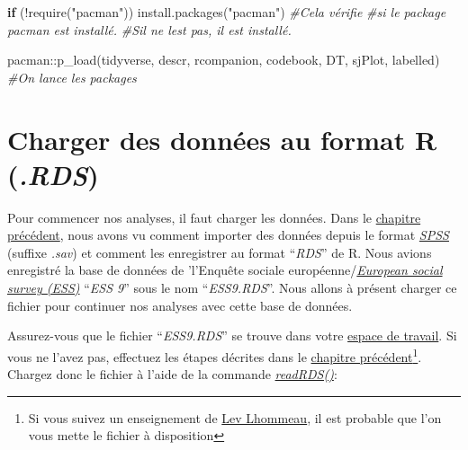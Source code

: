 \documentclass[
]{book}
\newenvironment{Shaded}{\begin{snugshade}}{\end{snugshade}}
\newcommand{\CommentTok}[1]{\textcolor[rgb]{0.56,0.35,0.01}{\textit{#1}}}
\newcommand{\ControlFlowTok}[1]{\textcolor[rgb]{0.13,0.29,0.53}{\textbf{#1}}}
\newcommand{\FunctionTok}[1]{\textcolor[rgb]{0.00,0.00,0.00}{#1}}
\newcommand{\NormalTok}[1]{#1}
\newcommand{\SpecialCharTok}[1]{\textcolor[rgb]{0.00,0.00,0.00}{#1}}
\newcommand{\StringTok}[1]{\textcolor[rgb]{0.31,0.60,0.02}{#1}}
\begin{document}
\begin{Shaded}
\begin{Highlighting}[]
\ControlFlowTok{if}\NormalTok{ (}\SpecialCharTok{!}\FunctionTok{require}\NormalTok{(}\StringTok{"pacman"}\NormalTok{)) }\FunctionTok{install.packages}\NormalTok{(}\StringTok{"pacman"}\NormalTok{) }\CommentTok{\#Cela vérifie}
                             \CommentTok{\#si le package pacman est installé.}
                             \CommentTok{\#S\textquotesingle{}il ne l\textquotesingle{}est pas, il est installé.}

\NormalTok{pacman}\SpecialCharTok{::}\FunctionTok{p\_load}\NormalTok{(tidyverse, descr, rcompanion, codebook,}
\NormalTok{               DT, sjPlot, labelled) }\CommentTok{\#On lance les packages}
\end{Highlighting}
\end{Shaded}

\hypertarget{charger-des-donnuxe9es-au-format-r-.rds}{%
\section{\texorpdfstring{Charger des données au format R (\emph{.RDS})}{Charger des données au format R (.RDS)}}\label{charger-des-donnuxe9es-au-format-r-.rds}}

Pour commencer nos analyses, il faut charger les données. Dans le \protect\hyperlink{import_donnees}{chapitre précédent}, nous avons vu comment importer des données depuis le format \href{https://www.ibm.com/fr-fr/products/spss-statistics}{\emph{SPSS}} (suffixe \emph{.sav}) et comment les enregistrer au format ``\emph{RDS}'' de R. Nous avions enregistré la base de données de 'l'Enquête sociale européenne/\href{https://www.europeansocialsurvey.org/}{\emph{European social survey (ESS)}} ``\emph{ESS 9}'' sous le nom ``\emph{ESS9.RDS}''. Nous allons à présent charger ce fichier pour continuer nos analyses avec cette base de données.

Assurez-vous que le fichier ``\emph{ESS9.RDS}'' se trouve dans votre \protect\hyperlink{working_directory}{espace de travail}. Si vous ne l'avez pas, effectuez les étapes décrites dans le \protect\hyperlink{import_donnees}{chapitre précédent}\footnote{Si vous suivez un enseignement de \href{mailto:lhommeau@gmail.com}{Lev Lhommeau}, il est probable que l'on vous mette le fichier à disposition}. Chargez donc le fichier à l'aide de la commande \href{https://www.rdocumentation.org/packages/base/versions/3.6.2/topics/readRDS}{\emph{readRDS()}}:
\end{document}
